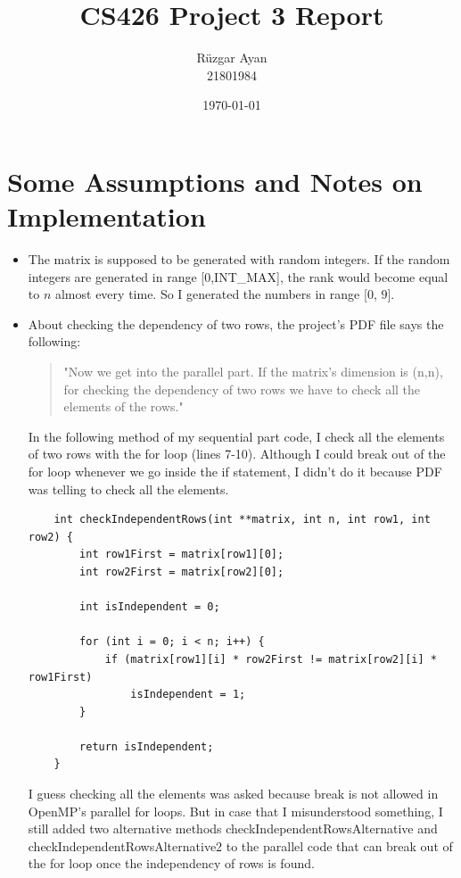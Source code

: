 \documentclass{article}
\title{CS426 Project 3 Report}
\author{Rüzgar Ayan \\ 21801984}
\date{\today}
\begin{document}
\maketitle

\section{Some Assumptions and Notes on Implementation}

\begin{itemize}
    \item The matrix is supposed to be generated with random integers. If the random integers are generated in range [$0$,INT\_MAX], the rank would become equal to $n$ almost every time. So I generated the numbers in range [$0$, $9$].

    \item About checking the dependency of two rows, the project's PDF file says the following:

    \begin{quote}
    "Now we get into the parallel part. If the matrix’s
    dimension is (n,n), for checking the dependency of two rows we have to check all the elements of the rows." 
    \end{quote}
    
    In the following method of my sequential part code, I check all the elements of two rows with the for loop (lines 7-10). Although I could break out of the for loop whenever we go inside the if statement, I didn't do it because PDF was telling to check all the elements.
    
    \begin{lstlisting}
    int checkIndependentRows(int **matrix, int n, int row1, int row2) {
    	int row1First = matrix[row1][0];
    	int row2First = matrix[row2][0];
    
    	int isIndependent = 0;
    
    	for (int i = 0; i < n; i++) {
    		if (matrix[row1][i] * row2First != matrix[row2][i] * row1First)
    			isIndependent = 1;
    	}
    	
    	return isIndependent;
    }
    \end{lstlisting}
    
    I guess checking all the elements was asked because break is not allowed in OpenMP's parallel for loops. But in case that I misunderstood something, I still added two alternative methods checkIndependentRowsAlternative and checkIndependentRowsAlternative2 to the parallel code that can break out of the for loop once the independency of rows is found.
\end{itemize}
\end{document}
